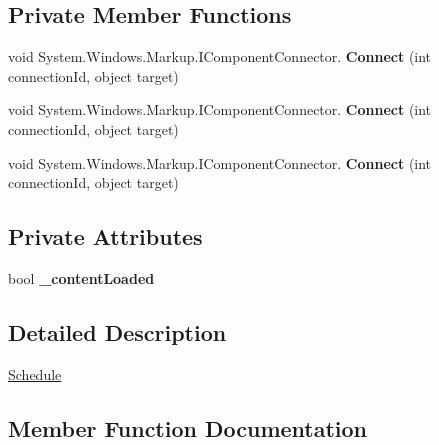 \subsection*{Private Member Functions}
\begin{DoxyCompactItemize}
\item 
\mbox{\label{class_teacher_handbook_1_1_plugins_1_1_schedule_1_1_schedule_a6b69e488632bb6650e94e68de0137da0}} 
void System.\+Windows.\+Markup.\+I\+Component\+Connector. {\bfseries Connect} (int connection\+Id, object target)
\item 
\mbox{\label{class_teacher_handbook_1_1_plugins_1_1_schedule_1_1_schedule_a6b69e488632bb6650e94e68de0137da0}} 
void System.\+Windows.\+Markup.\+I\+Component\+Connector. {\bfseries Connect} (int connection\+Id, object target)
\item 
\mbox{\label{class_teacher_handbook_1_1_plugins_1_1_schedule_1_1_schedule_a6b69e488632bb6650e94e68de0137da0}} 
void System.\+Windows.\+Markup.\+I\+Component\+Connector. {\bfseries Connect} (int connection\+Id, object target)
\end{DoxyCompactItemize}
\subsection*{Private Attributes}
\begin{DoxyCompactItemize}
\item 
\mbox{\label{class_teacher_handbook_1_1_plugins_1_1_schedule_1_1_schedule_aa1b4c4609f2d3f479a8c8566f988d11e}} 
bool {\bfseries \+\_\+content\+Loaded}
\end{DoxyCompactItemize}


\subsection{Detailed Description}
\mbox{\hyperlink{class_teacher_handbook_1_1_plugins_1_1_schedule_1_1_schedule}{Schedule}} 



\subsection{Member Function Documentation}
\mbox{\label{class_teacher_handbook_1_1_plugins_1_1_schedule_1_1_schedule_a4e0847c918304d0ce088671e13e8f9a6}} 
